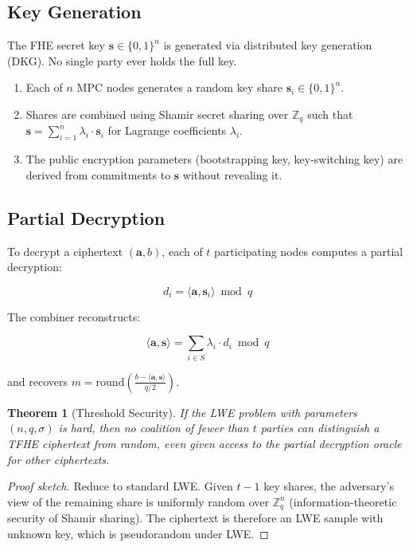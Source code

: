 \documentclass[11pt,a4paper]{article}
\newtheorem{theorem}{Theorem}[section]
\begin{document}
\subsection{Key Generation}

The FHE secret key $\mathbf{s} \in \{0,1\}^n$ is generated via distributed key generation (DKG). No single party ever holds the full key.

\begin{enumerate}[leftmargin=2em]
\item Each of $n$ MPC nodes generates a random key share $\mathbf{s}_i \in \{0,1\}^n$.
\item Shares are combined using Shamir secret sharing over $\mathbb{Z}_q$ such that $\mathbf{s} = \sum_{i=1}^{n} \lambda_i \cdot \mathbf{s}_i$ for Lagrange coefficients $\lambda_i$.
\item The public encryption parameters (bootstrapping key, key-switching key) are derived from commitments to $\mathbf{s}$ without revealing it.
\end{enumerate}

\subsection{Partial Decryption}

To decrypt a ciphertext $(\mathbf{a}, b)$, each of $t$ participating nodes computes a partial decryption:

$$d_i = \langle \mathbf{a}, \mathbf{s}_i \rangle \bmod q$$

The combiner reconstructs:

$$\langle \mathbf{a}, \mathbf{s} \rangle = \sum_{i \in S} \lambda_i \cdot d_i \bmod q$$

and recovers $m = \text{round}\left(\frac{b - \langle \mathbf{a}, \mathbf{s} \rangle}{q/2}\right)$.

\begin{theorem}[Threshold Security]
If the LWE problem with parameters $(n, q, \sigma)$ is hard, then no coalition of fewer than $t$ parties can distinguish a TFHE ciphertext from random, even given access to the partial decryption oracle for other ciphertexts.
\end{theorem}

\begin{proof}[Proof sketch]
Reduce to standard LWE. Given $t-1$ key shares, the adversary's view of the remaining share is uniformly random over $\mathbb{Z}_q^n$ (information-theoretic security of Shamir sharing). The ciphertext is therefore an LWE sample with unknown key, which is pseudorandom under LWE.
\end{proof}
\end{document}
